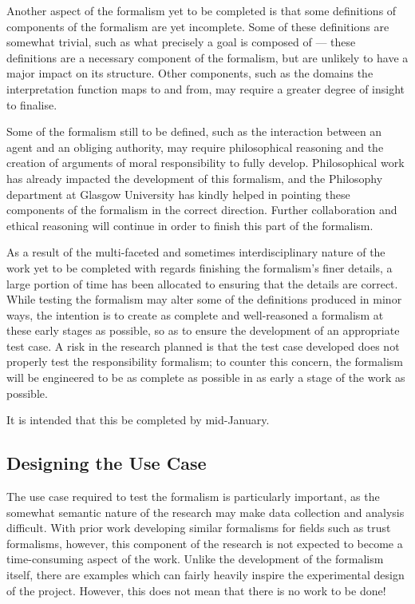 Another aspect of the formalism yet to be completed is that some definitions of components of the formalism are yet incomplete. Some of these definitions are somewhat trivial, such as what precisely a goal is composed of --- these definitions are a necessary component of the formalism, but are unlikely to have a major impact on its structure. Other components, such as the domains the interpretation function maps to and from, may require a greater degree of insight to finalise.\par

Some of the formalism still to be defined, such as the interaction between an agent and an obliging authority, may require philosophical reasoning and the creation of arguments of moral responsibility to fully develop. Philosophical work has already impacted the development of this formalism, and the Philosophy department at Glasgow University has kindly helped in pointing these components of the formalism in the correct direction. Further collaboration and ethical reasoning will continue in order to finish this part of the formalism. \par

As a result of the multi-faceted and sometimes interdisciplinary nature of the work yet to be completed with regards finishing the formalism's finer details, a large portion of time has been allocated to ensuring that the details are correct. While testing the formalism may alter some of the definitions produced in minor ways, the intention is to create as complete and well-reasoned a formalism at these early stages as possible, so as to ensure the development of an appropriate test case. A risk in the research planned is that the test case developed does not properly test the responsibility formalism; to counter this concern, the formalism will be engineered to be as complete as possible in as early a stage of the work as possible.\par

It is intended that this be completed by mid-January.\par

\subsection{Designing the Use Case}
The use case required to test the formalism is particularly important, as the somewhat semantic nature of the research may make data collection and analysis difficult. With prior work developing similar formalisms for fields such as trust formalisms, however, this component of the research is not expected to become a time-consuming aspect of the work. Unlike the development of the formalism itself, there are examples which can fairly heavily inspire the experimental design of the project. However, this does not mean that there is no work to be done!\par

